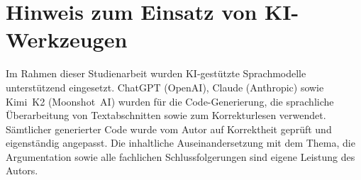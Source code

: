 \section*{Hinweis zum Einsatz von KI-Werkzeugen}

Im Rahmen dieser Studienarbeit wurden KI-gestützte Sprachmodelle unterstützend eingesetzt.
ChatGPT (OpenAI), Claude (Anthropic) sowie Kimi~K2 (Moonshot~AI) wurden für die
Code-Generierung, die sprachliche Überarbeitung von Textabschnitten sowie zum Korrekturlesen
verwendet. Sämtlicher generierter Code wurde vom Autor auf Korrektheit geprüft und
eigenständig angepasst. Die inhaltliche Auseinandersetzung mit dem Thema, die Argumentation
sowie alle fachlichen Schlussfolgerungen sind eigene Leistung des Autors.
